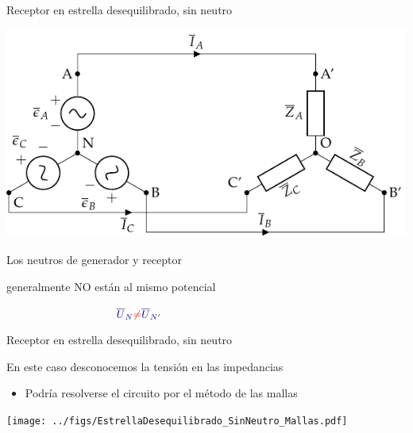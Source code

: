 \documentclass[aspectratio=169, usenames,svgnames,dvipsnames]{beamer}
\begin{document}

\begin{frame}{Receptor en estrella desequilibrado, \hspace{3mm} sin neutro}
    \vspace{-29mm}
    \begin{center}
        \includegraphics[width=.95\linewidth]{../figs/EstrellaDesequilibrado_SinNeutro.pdf}
    \end{center}
    
    \vspace{-65mm}
    
    \hspace*{41mm}
    \small{Los neutros de generador y receptor}

    \vspace{-1mm}
    
    \hspace*{37mm}
    \small{generalmente \alert{NO} están al mismo potencial}
    
    \LARGE{
    \(
        \qquad\qquad\qquad\qquad\qquad
        {\color{blue!50!black} \overline{U}_N} {\color{red} \neq } {\color{blue!50!black} \overline{U}_{N'} }
    \)
    }
\end{frame}


\begin{frame}{Receptor en estrella desequilibrado, \hspace{3mm} sin neutro}

    \vspace{2mm}
    En este caso \alert{desconocemos la tensión} en las impedancias

    \begin{itemize}
        \item Podría resolverse el circuito por el \alert{método de las mallas}
    \end{itemize} 

    \vspace{-1mm}
    \begin{center}
        \texttt{[image: ../figs/EstrellaDesequilibrado\_SinNeutro\_Mallas.pdf]}
    \end{center}    
\end{frame}
\end{document}
